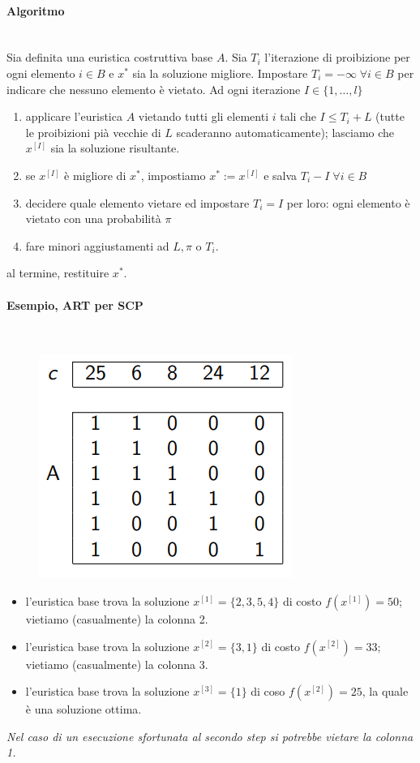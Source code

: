 \documentclass{article}
\begin{document}
\paragraph{Algoritmo}\mbox{}\\
Sia definita una euristica costruttiva base $A$. Sia $T_i$ l'iterazione di proibizione per ogni
elemento $i\in B$ e $x^*$ sia la soluzione migliore. Impostare $T_i=-\infty\;\forall i \in B$ per
indicare che nessuno elemento è vietato.
Ad ogni iterazione $I\in\{1,\dots,l\}$
\begin{enumerate}
    \item applicare l'euristica $A$ vietando tutti gli elementi $i$ tali che $I\leq T_i+L$
          (tutte le proibizioni pià vecchie di $L$ scaderanno automaticamente); lasciamo che $x^{[I]}$
          sia la soluzione risultante.
    \item se $x^{[I]}$ è migliore di $x^*$, impostiamo $x^*:=x^{[I]}$ e salva
          $T_i-I\;\forall i\in B$
    \item decidere quale elemento vietare ed impostare $T_i=I$ per loro: ogni elemento
          è vietato con una probabilità $\pi$
    \item fare minori aggiustamenti ad $L,\pi$ o $T_i$.
\end{enumerate}
al termine, restituire $x^*$.
\paragraph{Esempio, ART per SCP}\mbox{}\\

\begin{figure}[H]
    \centering
    \includegraphics[scale=0.5]{images/ART_SCP.png}
\end{figure}

\begin{itemize}
    \item l'euristica base trova la soluzione $x^{[1]}=\{2,3,5,4\}$ di costo $f\left(x^{[1]}\right)=50$;
          vietiamo (casualmente) la colonna 2.
    \item l'euristica base trova la soluzione $x^{[2]}=\{3,1\}$ di costo $f\left(x^{[2]}\right)=33$;
          vietiamo (casualmente) la colonna 3.
    \item l'euristica base trova la soluzione $x^{[3]}=\{1\}$ di coso $f\left(x^{[2]}\right)=25$,
          la quale è una soluzione ottima.
\end{itemize}
\textit{Nel caso di un esecuzione sfortunata al secondo step si potrebbe vietare la colonna 1.}
\end{document}
